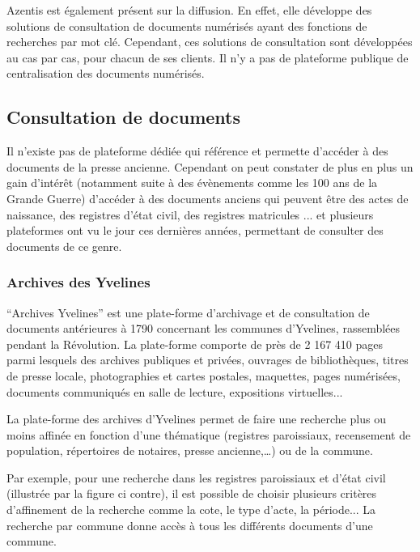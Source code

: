         Azentis est également présent sur la diffusion. En effet, elle développe des solutions de consultation de documents numérisés
        ayant des fonctions de recherches par mot clé. Cependant, ces solutions de consultation sont développées au cas par cas,
        pour chacun de ses clients. Il n'y a pas de plateforme publique de centralisation des documents numérisés.

    \subsection{Consultation de documents}
    \label{subsec:consultation}
    Il n’existe pas de plateforme dédiée qui référence et permette d’accéder à des documents de la presse ancienne. Cependant
    on peut constater de plus en plus un gain d’intérêt (notamment suite à des évènements comme les 100 ans de la Grande Guerre)
    d’accéder à des documents anciens qui peuvent être des actes de naissance, des registres d’état civil, des registres matricules ...
    et plusieurs plateformes ont vu le jour ces dernières années, permettant de consulter des documents de ce genre.


        \subsubsection{Archives des Yvelines}
        \label{subsubsec:yvelines}
        “Archives Yvelines” est une plate-forme d’archivage et de consultation de documents antérieures à 1790 concernant
        les communes d’Yvelines, rassemblées pendant la Révolution. La plate-forme comporte de près de 2 167 410 pages
        parmi lesquels  des archives publiques et privées, ouvrages de bibliothèques, titres de presse locale, photographies
        et cartes postales, maquettes, pages numérisées, documents communiqués en salle de lecture, expositions virtuelles...

        La plate-forme des archives d’Yvelines permet de faire une recherche plus ou moins affinée en fonction d’une thématique
        (registres paroissiaux, recensement de population, répertoires de notaires, presse ancienne,…) ou de la commune.

        Par exemple, pour une recherche dans les registres paroissiaux et d’état civil (illustrée par la figure ci contre),
        il est possible de choisir plusieurs critères d’affinement de la recherche comme la cote, le type d’acte, la période...
        La recherche par commune donne accès à tous les différents documents d’une commune.

